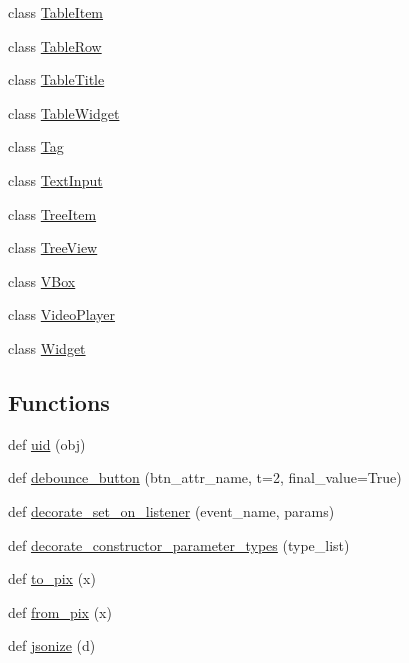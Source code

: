 \begin{DoxyCompactItemize}
class \hyperlink{classremi_1_1gui_1_1TableItem}{Table\+Item}
\item 
class \hyperlink{classremi_1_1gui_1_1TableRow}{Table\+Row}
\item 
class \hyperlink{classremi_1_1gui_1_1TableTitle}{Table\+Title}
\item 
class \hyperlink{classremi_1_1gui_1_1TableWidget}{Table\+Widget}
\item 
class \hyperlink{classremi_1_1gui_1_1Tag}{Tag}
\item 
class \hyperlink{classremi_1_1gui_1_1TextInput}{Text\+Input}
\item 
class \hyperlink{classremi_1_1gui_1_1TreeItem}{Tree\+Item}
\item 
class \hyperlink{classremi_1_1gui_1_1TreeView}{Tree\+View}
\item 
class \hyperlink{classremi_1_1gui_1_1VBox}{V\+Box}
\item 
class \hyperlink{classremi_1_1gui_1_1VideoPlayer}{Video\+Player}
\item 
class \hyperlink{classremi_1_1gui_1_1Widget}{Widget}
\end{DoxyCompactItemize}
\subsection*{Functions}
\begin{DoxyCompactItemize}
\item 
def \hyperlink{namespaceremi_1_1gui_a72befd0283e384996bdc2d11af2965a9}{uid} (obj)
\item 
def \hyperlink{namespaceremi_1_1gui_abc84b4bb98787ca297e706c524b0fbe7}{debounce\+\_\+button} (btn\+\_\+attr\+\_\+name, t=2, final\+\_\+value=True)
\item 
def \hyperlink{namespaceremi_1_1gui_a319f95dc483aa086b14641a1f12770d3}{decorate\+\_\+set\+\_\+on\+\_\+listener} (event\+\_\+name, params)
\item 
def \hyperlink{namespaceremi_1_1gui_a7402c18e8ec07b802d79231c72a7e818}{decorate\+\_\+constructor\+\_\+parameter\+\_\+types} (type\+\_\+list)
\item 
def \hyperlink{namespaceremi_1_1gui_a227ad2bbb3b116826483651f00380ada}{to\+\_\+pix} (x)
\item 
def \hyperlink{namespaceremi_1_1gui_a211a930a6e3c4451c04cbced38445b6a}{from\+\_\+pix} (x)
\item 
def \hyperlink{namespaceremi_1_1gui_a529a4fea1c4a205736d2739ec166ba04}{jsonize} (d)
\end{DoxyCompactItemize}
